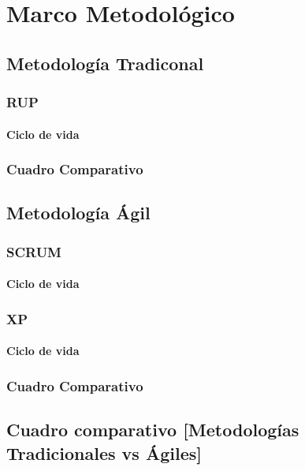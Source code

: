 \chapter{Marco Metodológico}


\section{Metodología Tradiconal} 
\subsection{RUP}
\subsubsection{Ciclo de vida}
\subsection{Cuadro Comparativo}

\section{Metodología Ágil} 
\subsection{SCRUM}
\subsubsection{Ciclo de vida}
\subsection{XP}
\subsubsection{Ciclo de vida}
\subsection{}
\subsection{Cuadro Comparativo}

\section{Cuadro comparativo [Metodologías Tradicionales vs Ágiles]} 
